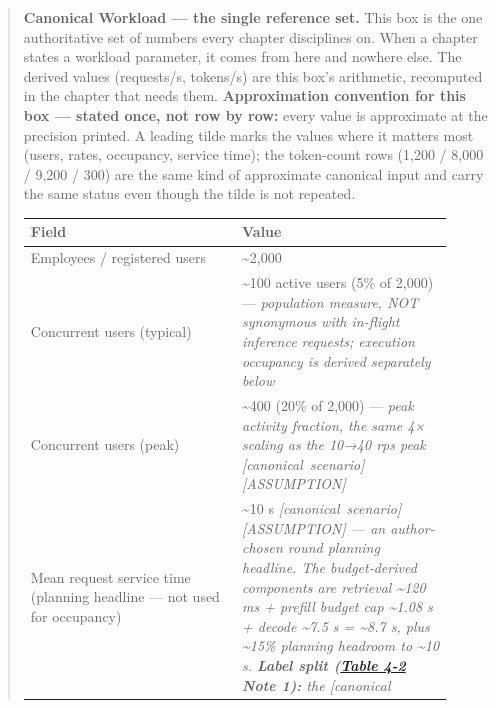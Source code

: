 \begin{quote}
\textbf{Canonical Workload --- the single reference set.} This box is
the one authoritative set of numbers every chapter disciplines on. When
a chapter states a workload parameter, it comes from here and nowhere
else. The derived values (requests/s, tokens/s) are this box's
arithmetic, recomputed in the chapter that needs them.
\textbf{Approximation convention for this box --- stated once, not row
by row:} every value is approximate at the precision printed. A leading
tilde marks the values where it matters most (users, rates, occupancy,
service time); the token-count rows (1,200 / 8,000 / 9,200 / 300) are
the same kind of approximate canonical input and carry the same status
even though the tilde is not repeated.

\nopagebreak[4]
\begin{longtable}[]{@{}
  >{\raggedright\arraybackslash}p{0.4527\linewidth}
  >{\raggedright\arraybackslash}p{0.4527\linewidth}@{}}
\toprule\noalign{}
\begin{minipage}[b]{\linewidth}\raggedright
Field
\end{minipage} & \begin{minipage}[b]{\linewidth}\raggedright
Value
\end{minipage} \\
\midrule\noalign{}
\endhead
\bottomrule\noalign{}
\endlastfoot
Employees / registered users & \textasciitilde2,000 \\
\noalign{\label{tab:4.3}}
Concurrent users (typical) & \textasciitilde100 active users (5\% of
2,000) --- \emph{population measure, NOT synonymous with in-flight
inference requests; execution occupancy is derived separately below} \\
Concurrent users (peak) & \textasciitilde400 (20\% of 2,000) ---
\emph{peak activity fraction, the same 4× scaling as the 10→40 rps peak
\mbox{{[}canonical scenario{]}}\hspace{0pt}\mbox{{[}ASSUMPTION{]}}} \\
Mean request service time (planning headline --- not used for occupancy)
& \textasciitilde10 s \emph{\mbox{{[}canonical scenario{]}}\hspace{0pt}\mbox{{[}ASSUMPTION{]}} ---
an author-chosen round planning headline. The budget-derived components
are retrieval \textasciitilde120 ms + prefill budget cap
\textasciitilde1.08 s + decode \textasciitilde7.5 s = \textasciitilde8.7
s, plus \textasciitilde15\% planning headroom to \textasciitilde10 s.
\textbf{Label split (\hyperref[tab:4.2]{Table 4-2} Note 1):} the \mbox{{[}canonical
}}
\end{longtable}
\end{quote}
